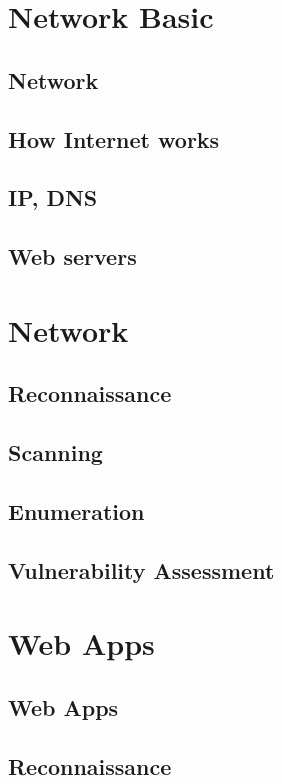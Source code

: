\documentclass[7x9]{times}
\begin{document}
\chapternotes



\chapter{Network Basic}


\section{Network}
\section{How Internet works}
\section{IP, DNS}
\section{Web servers}


\chapter{Network}

\section{Reconnaissance}
\section{Scanning}
\section{Enumeration}
\section{Vulnerability Assessment}



\chapter{Web Apps}
\section{Web Apps}
\section{Reconnaissance}
\end{document}
